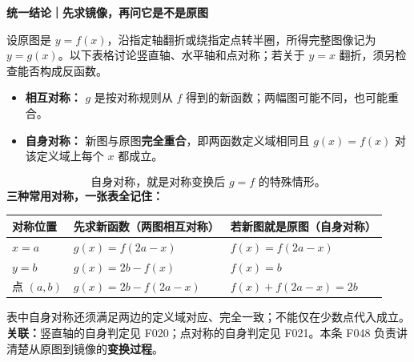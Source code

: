 \clearpage
\begin{statementbox}
\textbf{统一结论｜先求镜像，再问它是不是原图}


设原图是 $y=f(x)$，沿指定轴翻折或绕指定点转半圈，所得完整图像记为 $y=g(x)$。以下表格讨论竖直轴、水平轴和点对称；若关于 $y=x$ 翻折，须另检查能否构成反函数。
\begin{itemize}[leftmargin=*,itemsep=.35em,topsep=.3em]
\item \textbf{相互对称：} $g$ 是按对称规则从 $f$ 得到的新函数；两幅图可能不同，也可能重合。
\item \textbf{自身对称：} 新图与原图\textbf{完全重合}，即两函数定义域相同且 $g(x)=f(x)$ 对该定义域上每个 $x$ 都成立。
\end{itemize}
\[
\boxed{\text{自身对称，就是对称变换后 }g=f\text{ 的特殊情形。}}
\]
\textbf{三种常用对称，一张表全记住：}
\begin{center}\renewcommand{\arraystretch}{1.5}
\begin{tabular}{p{.19\linewidth}|p{.33\linewidth}|p{.32\linewidth}}
对称位置 & 先求新函数（两图相互对称） & 若新图就是原图（自身对称）\\\hline
$x=a$ & $g(x)=f(2a-x)$ & $f(x)=f(2a-x)$\\
$y=b$ & $g(x)=2b-f(x)$ & $f(x)=b$\\
点 $(a,b)$ & $g(x)=2b-f(2a-x)$ & $f(x)+f(2a-x)=2b$
\end{tabular}\end{center}
表中自身对称还须满足两边的定义域对应、完全一致；不能仅在少数点代入成立。
\textbf{关联：}竖直轴的自身判定见 F020；点对称的自身判定见 F021。本条 F048 负责讲清楚从原图到镜像的\textbf{变换过程}。
\end{statementbox}


